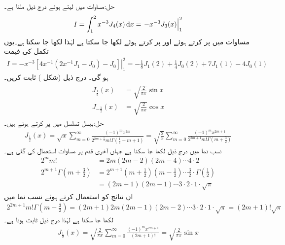 حل:مساوات  میں  لیتے ہوئے  درج ذیل ملتا ہے۔
\begin{align*}
I=\int_{1}^{2} x^{-3}J_4(x)\dif x=\left. -x^{-3}J_3(x)\right|_{1}^{2}
\end{align*}
مساوات  میں  پر کرتے ہوئے  اور  پر کرتے ہوئے  لکھا جا سکتا ہے لہٰذا  لکھا جا سکتا ہے۔یوں تکمل کی قیمت
\begin{align*}
I=\left.  -x^{-3}[4x^{-1}(2x^{-1}J_1-J_0)-J_0] \right|_{1}^{2}=-\frac{1}{8}J_1(2)+\frac{1}{4}J_0(2)+7J_1(1)-4J_0(1)
\end{align*}
ہو گی۔
درج ذیل (شکل ) ثابت کریں۔
\begin{gather}
\begin{aligned} \label{مساوات_بیسل_تعلق_کوسائن}
J_{\frac{1}{2}}(x)&=\sqrt{\frac{2}{\pi x}}\sin x\\
J_{-\frac{1}{2}}(x)&=\sqrt{\frac{2}{\pi x}}\cos x
\end{aligned}
\end{gather}
حل:بیسل تسلسل  میں  پر کرتے ہوئے ہیں۔
\begin{align*}
J_{\frac{1}{2}}(x)=\sqrt{x}\sum_{m=0}^{\infty}\frac{(-1)^m x^{2m}}{2^{2m+\frac{1}{2}}m!\Gamma(\frac{1}{2}+m+1)}=\sqrt{\frac{2}{x}}\sum_{m=0}^{\infty}\frac{(-1)^m x^{2m+1}}{2^{2m+1}m!\Gamma(m+\frac{3}{2})}
\end{align*}
نسب نما میں درج ذیل لکھا جا سکتا ہے جہاں آخری قدم پر مساوات  استعمال کی گئی ہے۔
\begin{align*}
2^mm!&=2m(2m-2)(2m-4)\cdots 4\cdot 2\\
2^{m+1}\Gamma(m+\tfrac{3}{2})&=2^{m+1}(m+\tfrac{1}{2})(m-\tfrac{1}{2})\cdots \tfrac{3}{2}\cdot \Gamma(\tfrac{1}{2})\\
&=(2m+1)(2m-1)\cdots 3\cdot 2\cdot 1\cdot \sqrt{\pi}
\end{align*}
ان نتائج کو استعمال کرتے ہوئے نسب نما میں
\begin{align*}
2^{2m+1}m!\Gamma(m+\tfrac{3}{2})=(2m+1)2m(2m-1)(2m-2)\cdots 3\cdot 2 \cdot 1\cdot \sqrt{\pi}=(2m+1)!\sqrt{\pi}
\end{align*}
لکھا جا سکتا ہے لہٰذا درج ذیل ثابت ہوتا ہے۔
\begin{align*}
J_{\frac{1}{2}}(x)=\sqrt{\frac{2}{\pi x}}\sum_{m=0}^{\infty}\frac{(-1)^m x^{2m+1}}{(2m+1)!}=\sqrt{\frac{2}{\pi x}}\sin x
\end{align*}
